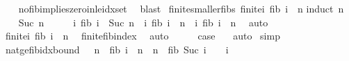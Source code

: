 \begin{isabellebody}
%
\isadelimproof
\ \ %
\endisadelimproof
%
\isatagproof
{}\isamarkupfalse%
\ no{\isacharunderscore}{\kern0pt}fib{\isacharunderscore}{\kern0pt}implies{\isacharunderscore}{\kern0pt}zero{\isacharunderscore}{\kern0pt}in{\isacharunderscore}{\kern0pt}le{\isacharunderscore}{\kern0pt}idx{\isacharunderscore}{\kern0pt}set\ \isamarkupfalse%
\ blast%
\endisatagproof
{\isafoldproof}%
%
\isadelimproof
\isanewline
%
\endisadelimproof
\isanewline
{}\isamarkupfalse%
\ finite{\isacharunderscore}{\kern0pt}smaller{\isacharunderscore}{\kern0pt}fibs{\isacharcolon}{\kern0pt}\ {\isachardoublequoteopen}finite{\isacharparenleft}{\kern0pt}{\isacharbraceleft}{\kern0pt}i{\isachardot}{\kern0pt}\ fib\ i\ {\isacharless}{\kern0pt}\ n{\isacharbraceright}{\kern0pt}{\isacharparenright}{\kern0pt}{\isachardoublequoteclose}\isanewline
%
\isadelimproof
%
\endisadelimproof
%
\isatagproof
{}\isamarkupfalse%
{\isacharparenleft}{\kern0pt}induct\ n{\isacharparenright}{\kern0pt}\isanewline
\ \ \isamarkupfalse%
\ {\isacharparenleft}{\kern0pt}Suc\ n{\isacharparenright}{\kern0pt}\isanewline
\ \ \isamarkupfalse%
\ \isamarkupfalse%
\ {\isachardoublequoteopen}{\isacharbraceleft}{\kern0pt}i{\isachardot}{\kern0pt}\ fib\ i\ {\isacharless}{\kern0pt}\ Suc\ n{\isacharbraceright}{\kern0pt}\ {\isacharequal}{\kern0pt}\ {\isacharbraceleft}{\kern0pt}i{\isachardot}{\kern0pt}\ fib\ i\ {\isacharless}{\kern0pt}\ n{\isacharbraceright}{\kern0pt}\ {\isasymunion}\ {\isacharbraceleft}{\kern0pt}i{\isachardot}{\kern0pt}\ fib\ i\ {\isacharequal}{\kern0pt}\ n{\isacharbraceright}{\kern0pt}{\isachardoublequoteclose}\ \isamarkupfalse%
\ auto\isanewline
\ \ \isamarkupfalse%
\ \isamarkupfalse%
\ {\isachardoublequoteopen}finite{\isacharparenleft}{\kern0pt}{\isacharbraceleft}{\kern0pt}i{\isachardot}{\kern0pt}\ fib\ i\ {\isacharequal}{\kern0pt}\ n{\isacharbraceright}{\kern0pt}{\isacharparenright}{\kern0pt}{\isachardoublequoteclose}\ \isamarkupfalse%
\ finite{\isacharunderscore}{\kern0pt}fib{\isacharunderscore}{\kern0pt}index\ \isamarkupfalse%
\ auto\isanewline
\ \ \isamarkupfalse%
\ \isamarkupfalse%
\ {\isacharquery}{\kern0pt}case\ \ \isamarkupfalse%
\ auto\isanewline
{}\isamarkupfalse%
\ simp%
\endisatagproof
{\isafoldproof}%
%
\isadelimproof
\isanewline
%
\endisadelimproof
\isanewline
{}\isamarkupfalse%
\ nat{\isacharunderscore}{\kern0pt}ge{\isacharunderscore}{\kern0pt}{}{\isacharunderscore}{\kern0pt}fib{\isacharunderscore}{\kern0pt}idx{\isacharunderscore}{\kern0pt}bound{\isacharcolon}{\kern0pt}\ {\isachardoublequoteopen}{}\ {\isasymle}\ n\ {\isasymLongrightarrow}\ fib\ i\ {\isasymle}\ n\ {\isasymLongrightarrow}\ n\ {\isacharless}{\kern0pt}\ fib\ {\isacharparenleft}{\kern0pt}Suc\ i{\isacharparenright}{\kern0pt}\ {\isasymLongrightarrow}\ {}\ {\isasymle}\ i{\isachardoublequoteclose}\isanewline

\end{isabellebody}
